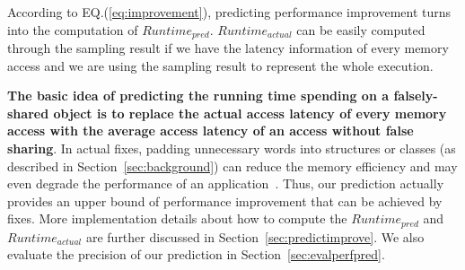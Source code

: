 According to EQ.(\ref{eq:improvement}), predicting performance improvement turns into the computation of $Runtime_{pred}$. $Runtime_{actual}$ can be easily computed through the sampling result if we have the latency information of every memory access and we are using the sampling result to represent the whole execution.  

{\bf The basic idea of predicting the running time spending on a falsely-shared object is to replace the actual access latency of every memory access with the average access latency of an access without false sharing}. In actual fixes,   padding unnecessary words into structures or classes (as described in Section~\ref{sec:background}) can reduce the memory efficiency and may even degrade the performance of an application~\cite{qinzhao}. Thus, our prediction actually provides an upper bound of performance improvement that can be achieved by fixes. More implementation details about how to compute the $Runtime_{pred}$ and $Runtime_{actual}$ are further discussed in Section~\ref{sec:predictimprove}. We also evaluate the precision of our prediction in Section~\ref{sec:evalperfpred}.


